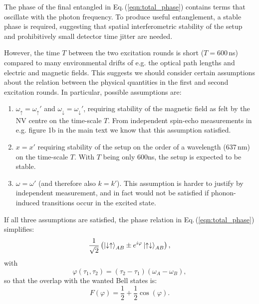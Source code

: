 The phase of the final entangled in Eq.\,(\ref{eqn:total_phase}) contains terms that oscillate with the photon frequency. To produce useful entanglement, a stable phase is required, suggesting that spatial interferometric stability of the setup and prohibitively small detector time jitter are needed. 

However, the time $T$ between the two excitation rounds is short ($T=600$\,ns) compared to many environmental drifts of e.g. the optical path lengths and electric and magnetic fields. This suggests we should consider certain assumptions about the relation between the physical quantities in the first and second excitation rounds. In particular, possible assumptions are:

\begin{enumerate}
\item $\omega_\uparrow = \omega_\uparrow'$ and $\omega_\downarrow=\omega_\downarrow'$, requiring stability of the magnetic field as felt by the NV centre on the time-scale $T$. From independent spin-echo measurements in e.g. figure 1b in the main text we know that this assumption satisfied.
\item $x=x'$ requiring stability of the setup on the order of a wavelength (637\,nm) on the time-scale $T$. With $T$ being only 600ns, the setup is expected to be stable. 
\item $\omega=\omega'$ (and therefore also $k=k'$). This assumption is harder to justify by independent measurement, and in fact would not be satisfied if phonon-induced transitions occur in the excited state. %
\end{enumerate}

If all three assumptions are satisfied, the phase relation in Eq.\,(\ref{eqn:total_phase}) simplifies: 
\begin{equation}
\frac{1}{\sqrt{2}}\left(\left|\downarrow\uparrow\right>_{AB} \pm e^{i\varphi} \left|\uparrow\downarrow\right>_{AB}\right),
\end{equation}
with
\begin{equation}
\label{eqn:phase_deph}
\varphi(\tau_1,\tau_2) = (\tau_2-\tau_1)(\omega_A - \omega_B),
\end{equation}
so that the overlap with the wanted Bell states is:
\begin{equation}
\label{eqn:fid_deph}
F(\varphi)= \frac{1}{2}+\frac{1}{2}\cos(\varphi).
\end{equation}


